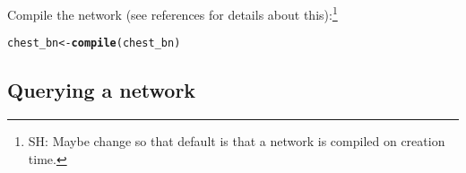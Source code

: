 \documentclass[10pt]{article}\usepackage[]{graphicx}\usepackage[]{color}
\makeatletter
\newcommand{\hlstd}[1]{\textcolor[rgb]{0.345,0.345,0.345}{#1}}%
\newcommand{\hlkwb}[1]{\textcolor[rgb]{0.69,0.353,0.396}{#1}}%
\newcommand{\hlkwd}[1]{\textcolor[rgb]{0.737,0.353,0.396}{\textbf{#1}}}%
\newenvironment{kframe}{%
 \def\at@end@of@kframe{}%
 \ifinner\ifhmode%
  \def\at@end@of@kframe{\end{minipage}}%
  \begin{minipage}{\columnwidth}%
 \fi\fi%
 \def\FrameCommand##1{\hskip\@totalleftmargin \hskip-\fboxsep
 \colorbox{shadecolor}{##1}\hskip-\fboxsep
     \hskip-\linewidth \hskip-\@totalleftmargin \hskip\columnwidth}%
 \MakeFramed {\advance\hsize-\width
   \@totalleftmargin\z@ \linewidth\hsize
   \@setminipage}}%
 {\par\unskip\endMakeFramed%
 \at@end@of@kframe}
\newenvironment{knitrout}{}{} %
\makeatother
\begin{document}
\begin{enumerate}
Compile the network (see references for details about
this):\footnote{SH: Maybe change so that default is that a network is
  compiled on creation time.}

\begin{knitrout}
\color{fgcolor}\begin{kframe}
\begin{alltt}
\hlstd{chest_bn} \hlkwb{<-} \hlkwd{compile}\hlstd{(chest_bn)}
\end{alltt}
\end{kframe}
\end{knitrout}

\end{enumerate}

\subsection{Querying a network}
\label{sec:querying-network}
\end{document}
